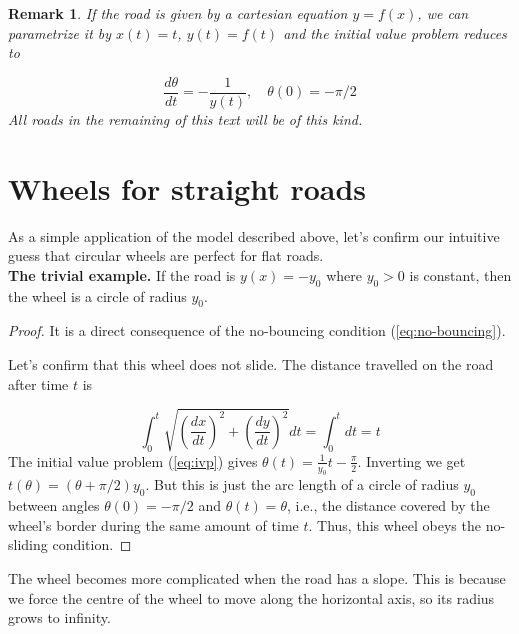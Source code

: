 \documentclass{article}
\theoremstyle{theorem}
\theoremstyle{theorem}
\newtheorem{remark}{Remark}[section]
\begin{document}
\begin{remark}
  If the road is given by a cartesian equation $y=f(x)$, we can
  parametrize it by $x(t)=t$, $y(t)=f(t)$ and the initial value
  problem reduces to

  \begin{equation}
    \label{eq:ivp}
    \frac{d\theta}{dt}=-\frac{1}{y(t)}, \quad \theta(0) = -\pi/2
  \end{equation}
  All roads in the remaining of this text will be of this kind.
\end{remark}


\section{Wheels for straight roads}
\label{sec:linear-roads}

As a simple application of the model described above, let's confirm
our intuitive guess that circular wheels are perfect for flat roads.
\\

\noindent \textbf{The trivial example.} If the road is $y(x)=-y_0 $
where $y_0>0$ is constant, then the wheel is a circle of radius $y_0$.

\begin{proof}
  It is a direct consequence of the no-bouncing condition
  (\ref{eq:no-bouncing}).

  Let's confirm that this wheel does not slide. The distance travelled
  on the road after time $t$ is

 \begin{equation*}
   \int_0^t{\sqrt{\left(\frac{dx}{dt}\right)^2+\left(\frac{dy}{dt}\right)^2}}
   dt =
   \int_0^t{dt} = t
 \end{equation*}
 The initial value problem (\ref{eq:ivp}) gives
 $\theta(t)=\frac{1}{y_0}t-\frac{\pi}{2}$. Inverting we get
 $t(\theta)=\left(\theta+\pi/2\right)y_0$. But this is just the arc
 length of a circle of radius $y_0$ between angles $\theta(0)=-\pi/2$
 and $\theta(t)=\theta$, i.e., the distance covered by the wheel's
 border during the same amount of time $t$. Thus, this wheel obeys the
 no-sliding condition.
\end{proof}

The wheel becomes more complicated when the road has a slope. This is
because we force the centre of the wheel to move along the horizontal
axis, so its radius grows to infinity.
\end{document}
